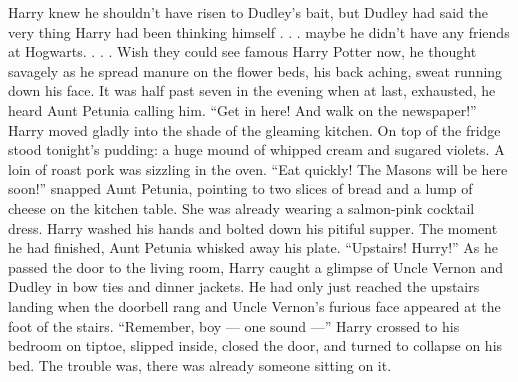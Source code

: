 \documentclass{article}%
\begin{document}
	Harry knew he shouldn’t have risen to Dudley’s bait, but Dudley had said the very thing\newline%
	Harry had been thinking himself . . . maybe he didn’t have any friends at Hogwarts. . . . \newline%
	Wish they could see famous Harry Potter now, he thought savagely as he spread manure on the flower beds,\newline%
	his back aching, sweat running down his face. It was half past seven in the evening when at last, exhausted,\newline%
	he heard Aunt Petunia calling him. “Get in here! And walk on the newspaper!” Harry moved gladly\newline%
	into the shade of the gleaming kitchen. On top of the fridge stood tonight’s pudding: a huge mound of \newline%
	whipped cream and sugared violets. A loin of roast pork was sizzling in the oven. “Eat quickly!\newline%
	The Masons will be here soon!” snapped Aunt Petunia, pointing to two slices of bread and a lump\newline%
	of cheese on the kitchen table. She was already wearing a salmon{-}pink cocktail dress. Harry \newline%
	washed his hands and bolted down his pitiful supper. The moment he had finished, Aunt Petunia\newline%
	whisked away his plate. “Upstairs! Hurry!” \newline%
\newline%
	As he passed the door to the living room, Harry caught a glimpse of Uncle Vernon and Dudley in bow ties\newline%
	and dinner jackets. He had only just reached the upstairs landing when the doorbell rang and \newline%
	Uncle Vernon’s furious face appeared at the foot of the stairs. “Remember, boy — one sound —” \newline%
	Harry crossed to his bedroom on tiptoe, slipped inside, closed the door, and turned to collapse on his bed.\newline%
	The trouble was, there was already someone sitting on it.

%
\end{document}
